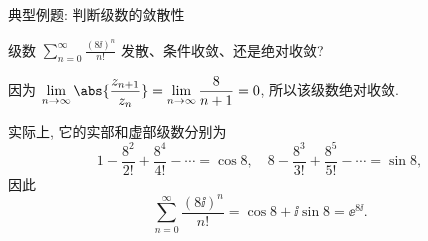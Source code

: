 \begin{frame}{典型例题: 判断级数的敛散性}
	\onslide<+->
	\begin{example}
		级数 $\displaystyle\sum_{n=0}^\infty\frac{(8\ii)^n}{n!}$ 发散、条件收敛、还是绝对收敛?
	\end{example}

	\onslide<+->
	\begin{solution}
		因为 $\displaystyle\lim_{n\to\infty}\abs{\frac{z_{n+1}}{z_n}}=\lim_{n\to\infty}\dfrac{8}{n+1}=0$, 所以该级数绝对收敛.
	\end{solution}

	\onslide<+->
	实际上, 它的实部和虚部级数分别为
	\[1-\frac{8^2}{2!}+\frac{8^4}{4!}-\cdots=\cos 8,\quad
	8-\frac{8^3}{3!}+\frac{8^5}{5!}-\cdots=\sin 8,
	\]
	\onslide<+->
	因此
	\[\sum_{n=0}^\infty\frac{(8\ii)^n}{n!}=\cos 8+\ii\sin 8=\ee^{8\ii}.
	\]
\end{frame}


